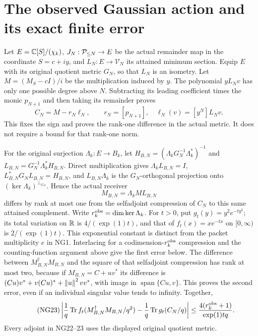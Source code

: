 \documentclass[11pt]{article}
\begin{document}
\section{The observed Gaussian action and its exact finite error}
Let $E=\mathbb C[S]/(\chi_k)$, $J_N:\mathcal P_{\le N}\to E$ be the actual
remainder map in the coordinate $S=c+iy$, and $L_N:E\to\mathcal V_N$
its attained minimum section. Equip $E$ with its original quotient
metric $G_N$, so that $L_N$ is an isometry. Let
$M=(M_S-cI)/i$ be the multiplication induced by $y$.
The polynomial $yL_Nv$ has only one possible degree above $N$.
Subtracting its leading coefficient times the monic $p_{N+1}$ and
then taking its remainder proves
\begin{equation}\tag{NG21}
 C_N=M-r_N\ell_N,\qquad
 r_N=[p_{N+1}],\quad \ell_N(v)=[y^N]L_Nv.
\end{equation}
This fixes the sign and proves the rank-one difference in the actual
metric. It does not require a bound for that rank-one norm.

For the original surjection $\Lambda_k:E\to B_k$, let
$H_{B,N}=(\Lambda_kG_N^{-1}\Lambda_k^*)^{-1}$ and
$L_{B,N}=G_N^{-1}\Lambda_k^*H_{B,N}$. Direct multiplication gives
$\Lambda_kL_{B,N}=I$, $L_{B,N}^*G_NL_{B,N}=H_{B,N}$, and
$L_{B,N}\Lambda_k$ is the $G_N$-orthogonal projection onto
$(\ker\Lambda_k)^{\perp_{G_N}}$. Hence the actual receiver
\begin{equation}\tag{NG22}
 M_{B,N}=\Lambda_kML_{B,N}
\end{equation}
differs by rank at most one from the selfadjoint compression of $C_N$
to this same attained complement. Write $r_k^{\rm obs}=\dim\ker\Lambda_k$.
For $t>0$, put $g_t(y)=y^2e^{-ty^2}$; its total variation on $\mathbb R$ is
$4/(\exp(1)t)$, and that of $f_t(x)=xe^{-tx}$ on $[0,\infty)$ is
$2/(\exp(1)t)$. This exponential constant is distinct from the packet
multiplicity $e$ in NG1.
Interlacing for a codimension-$r_k^{\rm obs}$ compression and the
counting-function argument above give the first error below.
The difference between $M_{B,N}^{\dagger}M_{B,N}$ and the square of
that selfadjoint compression has rank at most two, because if
$M_{B,N}=C+uv^*$ its difference is
$(Cu)v^*+v(Cu)^*+\left\lVert u\right\rVert^2vv^*$, with image in
$\operatorname{span}\{Cu,v\}$. This proves the second error, even if
an individual singular value tends to infinity. Together,
\begin{equation}\tag{NG23}
 \left|\frac1q\operatorname{Tr} f_t(M_{B,N}^{\dagger}M_{B,N}/q^2)
             -\frac1q\operatorname{Tr} g_t(C_N/q)\right|
 \le\frac{4(r_k^{\rm obs}+1)}{\exp(1)tq}.
\end{equation}
Every adjoint in NG22--23 uses the displayed original quotient metric.
\end{document}
